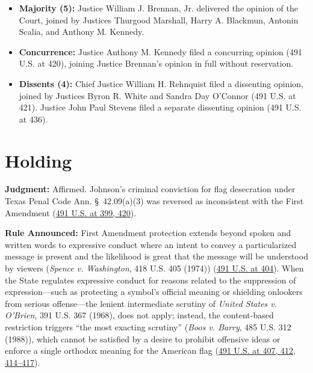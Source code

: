 \documentclass[12pt]{article}
\begin{document}
\begin{itemize}
    \item \textbf{Majority (5):} Justice William J. Brennan, Jr. delivered the opinion of the Court, joined by Justices Thurgood Marshall, Harry A. Blackmun, Antonin Scalia, and Anthony M. Kennedy.
    \item \textbf{Concurrence:} Justice Anthony M. Kennedy filed a concurring opinion (491 U.S. at 420), joining Justice Brennan's opinion in full without reservation.
    \item \textbf{Dissents (4):} Chief Justice William H. Rehnquist filed a dissenting opinion, joined by Justices Byron R. White and Sandra Day O'Connor (491 U.S. at 421). Justice John Paul Stevens filed a separate dissenting opinion (491 U.S. at 436).
\end{itemize}

\section{Holding}
\textbf{Judgment:} Affirmed. Johnson's criminal conviction for flag desecration under Texas Penal Code Ann. \S~42.09(a)(3) was reversed as inconsistent with the First Amendment (\href{https://supreme.justia.com/cases/federal/us/491/397/}{491 U.S. at 399, 420}).

\textbf{Rule Announced:} First Amendment protection extends beyond spoken and written words to expressive conduct where an intent to convey a particularized message is present and the likelihood is great that the message will be understood by viewers (\textit{Spence v. Washington}, 418 U.S. 405 (1974)) (\href{https://supreme.justia.com/cases/federal/us/491/397/}{491 U.S. at 404}). When the State regulates expressive conduct for reasons related to the suppression of expression---such as protecting a symbol's official meaning or shielding onlookers from serious offense---the lenient intermediate scrutiny of \textit{United States v. O'Brien}, 391 U.S. 367 (1968), does not apply; instead, the content-based restriction triggers ``the most exacting scrutiny'' (\textit{Boos v. Barry}, 485 U.S. 312 (1988)), which cannot be satisfied by a desire to prohibit offensive ideas or enforce a single orthodox meaning for the American flag (\href{https://supreme.justia.com/cases/federal/us/491/397/}{491 U.S. at 407, 412, 414--417}).
\end{document}
